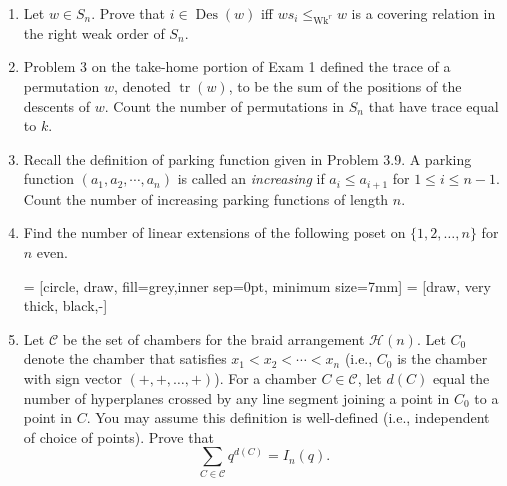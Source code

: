 \documentclass[11pt]{scrartcl}
\theoremstyle{definition}
\newcommand{\tr}{\operatorname{tr}}
\newcommand{\Des}{\operatorname{Des}}
\newcommand{\Wk}{\operatorname{Wk}}
\begin{document}
\begin{enumerate}

\item Let $w\in S_n$. Prove that $i\in \Des(w)$ iff $ws_i\leq_{\Wk^r}w$ is a covering relation in the right weak order of $S_n$.

\item Problem 3 on the take-home portion of Exam 1 defined the trace of a permutation $w$, denoted $\tr(w)$, to be the sum of the positions of the descents of $w$. Count the number of permutations in $S_n$ that have trace equal to $k$.

\item Recall the definition of parking function given in Problem 3.9.  A parking function $(a_1,a_2,\cdots,a_n)$ is called an \emph{increasing} if $a_i\leq a_{i+1}$ for $1\leq i\leq n-1$. Count the number of increasing parking functions of length $n$.

\item Find the number of linear extensions of the following poset on $\{1,2,\ldots,n\}$ for $n$ even.

\bigskip

 = [circle, draw, fill=grey,inner sep=0pt, minimum size=7mm]
 = [draw, very thick, black,-]

\begin{center}
\end{center}

\item Let $\mathcal{C}$ be the set of chambers for the braid arrangement $\mathcal{H}(n)$.  Let $C_0$ denote the chamber that satisfies $x_1<x_2<\cdots <x_n$ (i.e., $C_0$ is the chamber with sign vector $(+,+,\ldots,+)$). For a chamber $C\in\mathcal{C}$, let $d(C)$ equal the number of hyperplanes crossed by any line segment joining a point in $C_0$ to a point in $C$.  You may assume this definition is well-defined (i.e., independent of choice of points). Prove that
\[
\sum_{C\in \mathcal{C}}q^{d(C)}=I_n(q).
\]


\end{enumerate}
\end{document}
